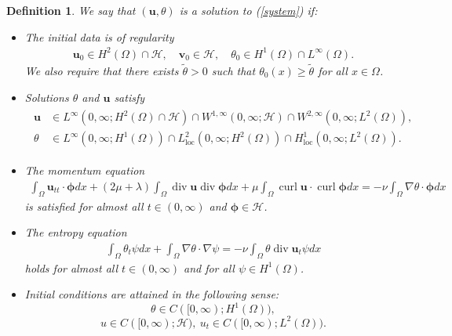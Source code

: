 \documentclass[10pt,a4paper]{amsart}
\newtheorem{defi}{Definition}
\renewcommand{\H}{\mathcal{H}}
\newcommand\bb[1]{\mathbf{#1}}
\newcommand{\bs}[1]{\boldsymbol{#1}}
\newcommand{\bu}{\bb{u}}
\DeclareMathOperator{\curl}{curl}
\renewcommand{\div}{\operatorname{div}}
\renewcommand{\hom}{H^1(\tn)}
\newcommand{\htwo}{H^2(\Omega)}
\newcommand{\io}{\int_{\Omega}}
\newcommand{\ld}{L^2(\Omega)}
\newcommand{\loc}{\operatorname{loc}}
\newcommand{\tn}{\Omega}
\newcommand{\wspnd}{2\mu+\lambda}
\begin{document}
\begin{defi}\label{soldef}
We say that $(\bb u,\theta)$ is a solution to (\ref{system}) if:
\begin{itemize}
\item The initial data is of regularity
\begin{align*}
\bb u_0\in \htwo\cap\H,\quad \bb v_0\in\H,\quad \theta_0\in\hom\cap L^{\infty}(\tn).
\end{align*}
We also require that there exists $\tilde{\theta}>0$ such that $\theta_0(x)\geq\tilde{\theta}$ for all $x\in\tn$.
\item Solutions $\theta$ and $\bu$ satisfy
\begin{align}\label{reggl}
\begin{split}
\bu&\in L^{\infty}(0,\infty;\htwo\cap\H)\cap W^{1,\infty}(0,\infty;\H)\cap W^{2,\infty}(0,\infty;\ld),\\
\theta&\in L^{\infty}(0,\infty;\hom)\cap L^2_{\loc}(0,\infty;\htwo)\cap H^1_{\loc}(0,\infty; \ld).
\end{split}
\end{align}
\item The momentum equation
\begin{align}\label{defmom}
 \io\bb u_{tt}\cdot\bs\phi dx+(\wspnd)\io\div\bb u\div\bs\phi dx+\mu\io\curl\bb u\cdot\curl\bs\phi dx =-\nu\io\nabla\theta\cdot\bs\phi dx
\end{align}
is satisfied for almost all $t\in (0,\infty)$ and $\bs\phi\in\H$.
\item The entropy equation
\begin{align}\label{defheat}
\io\theta_t\psi dx+\io\nabla\theta\cdot\nabla\psi=-\nu\io\theta \div\bb u_{t}\psi dx
\end{align}
holds for almost all $t\in (0,\infty)$ and for all $\psi\in\hom$.
\item Initial conditions are attained in the following sense:
\[
\theta \in C([0,\infty);\hom),
\]
\[
u\in C([0,\infty);\H),\ u_t \in C([0,\infty);\ld).
\]
\end{itemize}
\end{defi}
\end{document}
